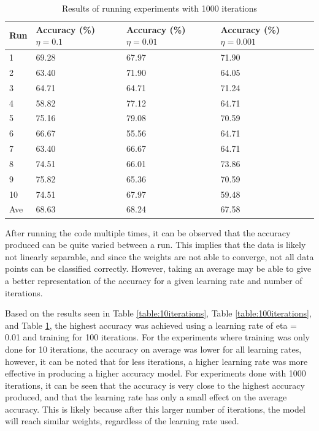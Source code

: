 \documentclass[10pt,twocolumn,a4paper]{article}
\begin{document}
\begin{table}[h!]
\begin{center}
\begin{tabular}{ |p{2em}|p{5em}|p{5em}|p{5em}| } 
\hline
Run & Accuracy (\%) $\eta=0.1$ & Accuracy (\%) $\eta=0.01$ & Accuracy (\%) $\eta=0.001$\\
\hline
1& 69.28& 67.97& 71.90 \\
2& 63.40& 71.90& 64.05 \\
3& 64.71& 64.71& 71.24 \\
4& 58.82& 77.12& 64.71 \\
5& 75.16& 79.08& 70.59 \\
6& 66.67& 55.56& 64.71 \\
7& 63.40& 66.67& 64.71 \\
8& 74.51& 66.01& 73.86 \\
9& 75.82& 65.36& 70.59 \\
10& 74.51& 67.97& 59.48 \\
\hline
Ave& 68.63& 68.24& 67.58 \\

\hline
\end{tabular}
\caption{Results of running experiments with 1000 iterations}
\label{table:1000iterations}
\end{center}
\end{table}

After running the code multiple times, it can be observed that the accuracy produced can be quite varied between a run. This implies that the data is likely not linearly separable, and since the weights are not able to converge, not all data points can be classified correctly. However, taking an average may be able to give a better representation of the accuracy for a given learning rate and number of iterations.

Based on the results seen in Table \ref{table:10iterations}, Table \ref{table:100iterations}, and Table \ref{table:1000iterations}, the highest accuracy was achieved using a learning rate of eta = 0.01 and training for 100 iterations. For the experiments where training was only done for 10 iterations, the accuracy on average was lower for all learning rates, however, it can be noted that for less iterations, a higher learning rate was more effective in producing a higher accuracy model. For experiments done with 1000 iterations, it can be seen that the accuracy is very close to the highest accuracy produced, and that the learning rate has only a small effect on the average accuracy. This is likely because after this larger number of iterations, the model will reach similar weights, regardless of the learning rate used.
\end{document}
